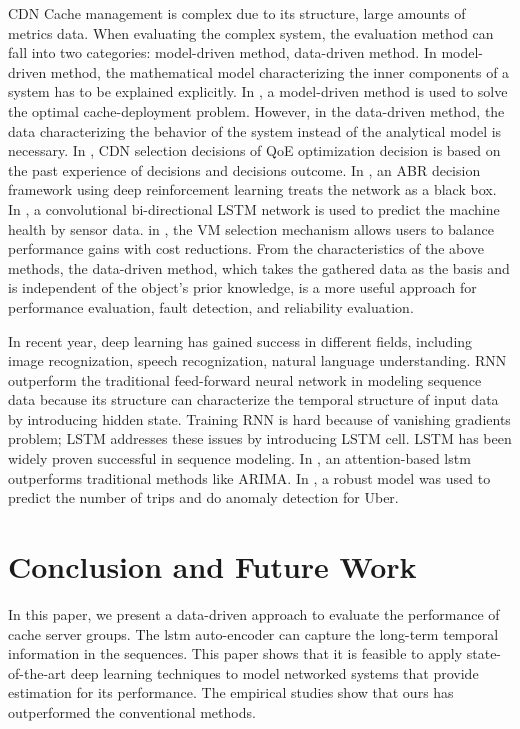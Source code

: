 \documentclass[5p]{elsarticle}
\begin{document}
CDN Cache management is complex due to its structure, large amounts of metrics data. When evaluating the complex system, the evaluation method can fall into two categories: model-driven method, data-driven method. In model-driven method, the mathematical model characterizing the inner components of a system has to be explained explicitly. In \cite{Tang2017RethinkingDemands}, a model-driven method is used to solve the optimal cache-deployment problem. However, in the data-driven method, the data characterizing the behavior of the system instead of the analytical model is necessary. In \cite{Jiang2017Pytheas:Exploration-Exploitation}, CDN selection decisions of QoE optimization decision is based on the past experience of decisions and decisions outcome. In \cite{Mao2017NeuralPensieve}, an ABR decision framework using deep reinforcement learning treats the network as a black box. In \cite{Zhao2017LearningNetworks}, a convolutional bi-directional LSTM network is used to predict the machine health by sensor data. in \cite{Yadwadkar2017SelectingClouds}, the VM selection mechanism allows users to balance performance gains with cost reductions. From the characteristics of the above methods, the data-driven method, which takes the gathered data as the basis and is independent of the object’s prior knowledge, is a more useful approach for performance evaluation, fault detection, and reliability evaluation.

In recent year, deep learning has gained success in different fields, including image recognization, speech recognization, natural language understanding\cite{Lecun2015}. RNN\cite{Schmidhuber1989} outperform the traditional feed-forward neural network in modeling sequence data because its structure can characterize the temporal structure of input data by introducing hidden state. Training RNN is hard because of vanishing gradients problem; LSTM addresses these issues by introducing LSTM cell\cite{Hochreiter1997LongMemory}. LSTM has been widely proven successful in sequence modeling. In \cite{Qin}, an attention-based lstm outperforms traditional methods like ARIMA. In \cite{Zhu2017DeepUber}, a robust model was used to predict the number of trips and do anomaly detection for Uber. 

\section{Conclusion and Future Work}

In this paper, we present a data-driven approach to evaluate the performance of cache server groups. The lstm auto-encoder can capture the long-term temporal information in the sequences. This paper shows that it is feasible to apply state-of-the-art deep learning techniques to model networked systems that provide estimation for its performance. The empirical studies show that ours has outperformed the conventional methods.
\end{document}
